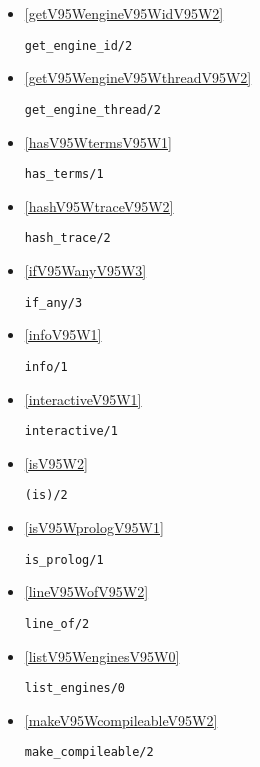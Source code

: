 \begin{itemize}
\item \ref{getV95WengineV95WidV95W2} 
\begin{verbatim}
get_engine_id/2
\end{verbatim}

\item \ref{getV95WengineV95WthreadV95W2} 
\begin{verbatim}
get_engine_thread/2
\end{verbatim}

\item \ref{hasV95WtermsV95W1} 
\begin{verbatim}
has_terms/1
\end{verbatim}

\item \ref{hashV95WtraceV95W2} 
\begin{verbatim}
hash_trace/2
\end{verbatim}

\item \ref{ifV95WanyV95W3} 
\begin{verbatim}
if_any/3
\end{verbatim}

\item \ref{infoV95W1} 
\begin{verbatim}
info/1
\end{verbatim}

\item \ref{interactiveV95W1} 
\begin{verbatim}
interactive/1
\end{verbatim}

\item \ref{isV95W2} 
\begin{verbatim}
(is)/2
\end{verbatim}

\item \ref{isV95WprologV95W1} 
\begin{verbatim}
is_prolog/1
\end{verbatim}

\item \ref{lineV95WofV95W2} 
\begin{verbatim}
line_of/2
\end{verbatim}

\item \ref{listV95WenginesV95W0} 
\begin{verbatim}
list_engines/0
\end{verbatim}

\item \ref{makeV95WcompileableV95W2} 
\begin{verbatim}
make_compileable/2
\end{verbatim}


\end{itemize}
